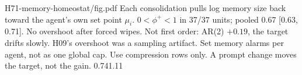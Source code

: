 {H71-memory-homeostat/fig.pdf}
{Each consolidation pulls log memory size back toward the agent's own set point $\mu_i$.}
{$0<\phi^+<1$ in 37/37 units; pooled 0.67 [0.63, 0.71]. No overshoot after forced wipes. Not first order: AR(2) $+0.19$, the target drifts slowly. H09's overshoot was a sampling artifact.}
{Set memory alarms per agent, not as one global cap. Use compression rows only. A prompt change moves the target, not the gain.}
{0.74}{1.11}
